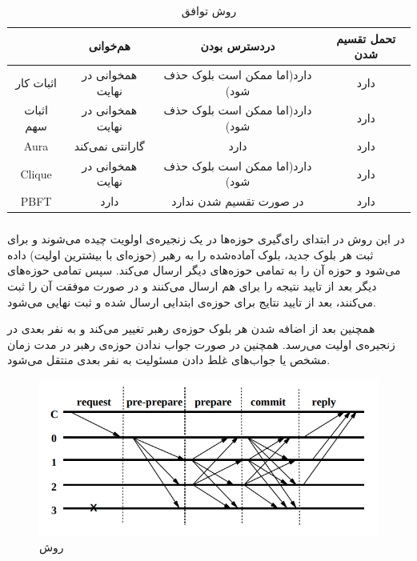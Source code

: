 \begin{table}[th!]
	\begin{center}
		\caption{روش توافق}
		\begin{tabular}{|c|c|c|c|}
			\hline
			& هم‌خوانی & دردسترس بودن & تحمل تقسیم شدن \\
			\hline
		 اثبات کار & همخوانی‌ در نهایت & دارد(اما ممکن است بلوک حذف شود) & دارد \\
			\hline
		 اثبات سهم & همخوانی‌ در نهایت & دارد(اما ممکن است بلوک حذف شود) & دارد \\
\hline
		 Aura & گارانتی نمی‌کند & دارد & دارد \\
\hline
		 Clique & همخوانی‌ در نهایت & دارد(اما ممکن است بلوک حذف شود) & دارد \\
\hline
PBFT & دارد & در صورت تقسیم شدن ندارد & دارد \\
\hline
		\end{tabular}
		\label{tab:cons}
	\end{center}
\end{table}


\subsubsection{}

 در این روش در ابتدای رای‌گیری حوزه‌ها در یک زنجیره‌ی اولویت چیده می‌شوند و برای ثبت هر بلوک جدید، بلوک آماده‌شده را به رهبر (حوزه‌ای با بیشترین اولیت) داده می‌شود و حوزه آن‌ را به تمامی حوزه‌های دیگر ارسال می‌کند. سپس تمامی حوزه‌های دیگر بعد از تایید نتیجه را برای هم ارسال می‌کنند و در صورت موفقت آن را ثبت می‌کنند، بعد از تایید نتایج برای حوزه‌ی ابتدایی ارسال شده و ثبت نهایی می‌شود.
 \par
 همچنین بعد از اضافه شدن هر بلوک حوزه‌ی رهبر تغییر می‌کند و به نفر بعدی در زنجیره‌ی اولیت می‌رسد. همچنین در صورت جواب ندادن حوزه‌ی رهبر در مدت زمان مشخص یا جواب‌های غلط دادن مسئولیت به نفر بعدی منتقل می‌شود. 
 
 \begin{figure}[h!]
 	\centering
 	\includegraphics[width=1\linewidth]{PBFT.png}
 	\caption {روش }
 	\label{fig:PBFT}
 \end{figure}
 

